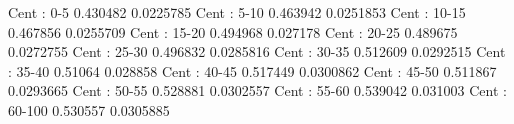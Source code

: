 Cent : 0-5
0.430482 0.0225785
Cent : 5-10
0.463942 0.0251853
Cent : 10-15
0.467856 0.0255709
Cent : 15-20
0.494968 0.027178
Cent : 20-25
0.489675 0.0272755
Cent : 25-30
0.496832 0.0285816
Cent : 30-35
0.512609 0.0292515
Cent : 35-40
0.51064 0.028858
Cent : 40-45
0.517449 0.0300862
Cent : 45-50
0.511867 0.0293665
Cent : 50-55
0.528881 0.0302557
Cent : 55-60
0.539042 0.031003
Cent : 60-100
0.530557 0.0305885
